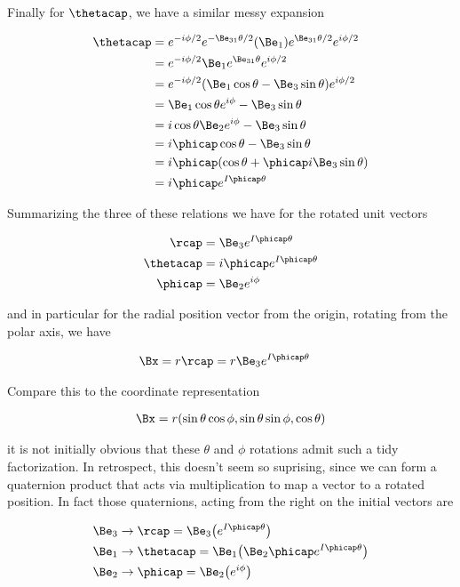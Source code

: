 Finally for $\thetacap$, we have a similar messy expansion

\begin{align*}
\thetacap 
&= e^{-i \phi/2} e^{-\Be_{31}\theta/2} (\Be_1) e^{\Be_{31}\theta/2} e^{i\phi/2} \\
&= e^{-i \phi/2} \Be_1 e^{\Be_{31}\theta} e^{i\phi/2} \\
&= e^{-i \phi/2} (\Be_1 \cos\theta - \Be_3 \sin\theta) e^{i\phi/2} \\
&= \Be_1 \cos\theta e^{i\phi} - \Be_3 \sin\theta \\
&= i \cos\theta \Be_2 e^{i\phi} - \Be_3 \sin\theta \\
&= i \phicap \cos\theta - \Be_3 \sin\theta \\
&= i \phicap (\cos\theta + \phicap i \Be_3 \sin\theta) \\
&= i \phicap e^{I\phicap\theta}
\end{align*}

Summarizing the three of these relations we have for the rotated unit vectors

\begin{align}\label{eqn:sphericalPolarUnit:foo5}
\rcap &= \Be_3 e^{I \phicap \theta} \\
\thetacap &= i \phicap e^{I \phicap \theta} \\
\phicap &= \Be_2 e^{i\phi} 
\end{align}

and in particular for the radial position vector from the origin, rotating from the polar axis, we have

\begin{align}\label{eqn:sphericalPolarUnit:foo6}
\Bx &= r \rcap = r \Be_3 e^{I\phicap \theta}
\end{align}

Compare this to the coordinate representation

\begin{align}\label{eqn:sphericalPolarUnit:foo7}
\Bx = r(\sin\theta \cos\phi, \sin\theta \sin\phi, \cos\theta)
\end{align}

it is not initially obvious that these $\theta$ and $\phi$ rotations admit such a tidy factorization.  In retrospect, this doesn't seem so suprising, since we can form a quaternion product that acts via multiplication to map a vector to a rotated position.  In fact those quaternions, acting from the right on the initial vectors are 

\begin{align}\label{eqn:sphericalPolarUnit:foo8}
\Be_3 &\rightarrow \rcap = \Be_3 \bigl( e^{I \phicap \theta} \bigr) \\
\Be_1 &\rightarrow \thetacap = \Be_1 \bigl( \Be_2 \phicap e^{I \phicap \theta} \bigr) \\
\Be_2 &\rightarrow \phicap = \Be_2 \bigl( e^{i\phi} \bigr)
\end{align}


